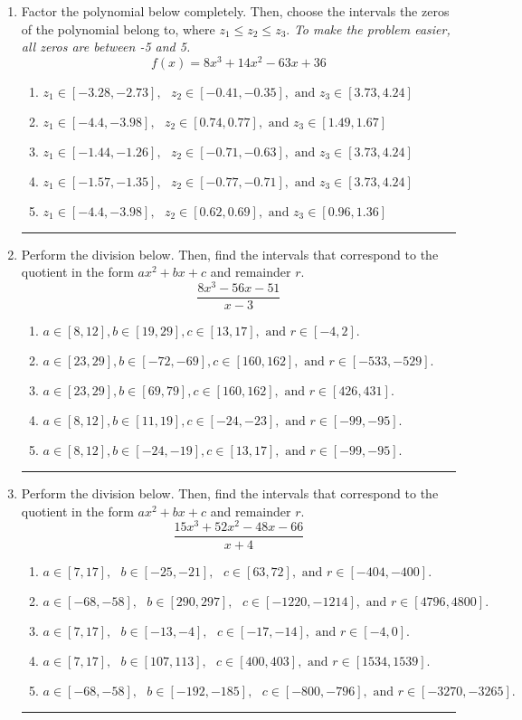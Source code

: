 \documentclass[14pt]{extbook}
\newcommand{\litem}[1]{\item#1\hspace*{-1cm}\rule{\textwidth}{0.4pt}}
\begin{document}
\begin{enumerate}
\litem{
Factor the polynomial below completely. Then, choose the intervals the zeros of the polynomial belong to, where $z_1 \leq z_2 \leq z_3$. \textit{To make the problem easier, all zeros are between -5 and 5.}\[ f(x) = 8x^{3} +14 x^{2} -63 x + 36 \]\begin{enumerate}[label=\Alph*.]
\item \( z_1 \in [-3.28, -2.73], \text{   }  z_2 \in [-0.41, -0.35], \text{   and   } z_3 \in [3.73, 4.24] \)
\item \( z_1 \in [-4.4, -3.98], \text{   }  z_2 \in [0.74, 0.77], \text{   and   } z_3 \in [1.49, 1.67] \)
\item \( z_1 \in [-1.44, -1.26], \text{   }  z_2 \in [-0.71, -0.63], \text{   and   } z_3 \in [3.73, 4.24] \)
\item \( z_1 \in [-1.57, -1.35], \text{   }  z_2 \in [-0.77, -0.71], \text{   and   } z_3 \in [3.73, 4.24] \)
\item \( z_1 \in [-4.4, -3.98], \text{   }  z_2 \in [0.62, 0.69], \text{   and   } z_3 \in [0.96, 1.36] \)

\end{enumerate} }
\litem{
Perform the division below. Then, find the intervals that correspond to the quotient in the form $ax^2+bx+c$ and remainder $r$.\[ \frac{8x^{3} -56 x -51}{x -3} \]\begin{enumerate}[label=\Alph*.]
\item \( a \in [8, 12], b \in [19, 29], c \in [13, 17], \text{ and } r \in [-4, 2]. \)
\item \( a \in [23, 29], b \in [-72, -69], c \in [160, 162], \text{ and } r \in [-533, -529]. \)
\item \( a \in [23, 29], b \in [69, 79], c \in [160, 162], \text{ and } r \in [426, 431]. \)
\item \( a \in [8, 12], b \in [11, 19], c \in [-24, -23], \text{ and } r \in [-99, -95]. \)
\item \( a \in [8, 12], b \in [-24, -19], c \in [13, 17], \text{ and } r \in [-99, -95]. \)

\end{enumerate} }
\litem{
Perform the division below. Then, find the intervals that correspond to the quotient in the form $ax^2+bx+c$ and remainder $r$.\[ \frac{15x^{3} +52 x^{2} -48 x -66}{x + 4} \]\begin{enumerate}[label=\Alph*.]
\item \( a \in [7, 17], \text{   } b \in [-25, -21], \text{   } c \in [63, 72], \text{   and   } r \in [-404, -400]. \)
\item \( a \in [-68, -58], \text{   } b \in [290, 297], \text{   } c \in [-1220, -1214], \text{   and   } r \in [4796, 4800]. \)
\item \( a \in [7, 17], \text{   } b \in [-13, -4], \text{   } c \in [-17, -14], \text{   and   } r \in [-4, 0]. \)
\item \( a \in [7, 17], \text{   } b \in [107, 113], \text{   } c \in [400, 403], \text{   and   } r \in [1534, 1539]. \)
\item \( a \in [-68, -58], \text{   } b \in [-192, -185], \text{   } c \in [-800, -796], \text{   and   } r \in [-3270, -3265]. \)


\end{enumerate}}
\end{enumerate}
\end{document}

